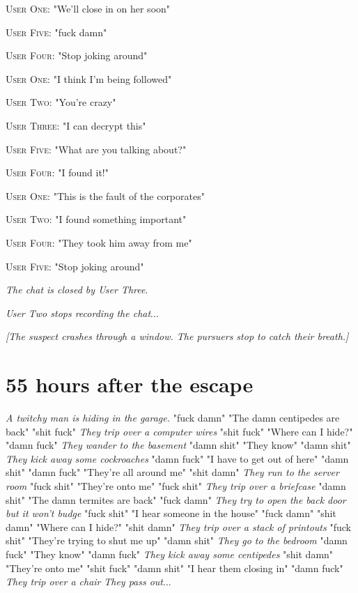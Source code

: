 \documentclass{report}
\begin{document}
\textsc{User One}: "We'll close in on her soon" 

\textsc{User Five}: "fuck damn" 

\textsc{User Four}: "Stop joking around" 

\textsc{User One}: "I think I'm being followed" 

\textsc{User Two}: "You're crazy" 

\textsc{User Three}: "I can decrypt this" 

\textsc{User Five}: "What are you talking about?" 

\textsc{User Four}: "I found it!" 

\textsc{User One}: "This is the fault of the corporates" 

\textsc{User Two}: "I found something important" 

\textsc{User Four}: "They took him away from me" 

\textsc{User Five}: "Stop joking around" 

\textit{The chat is closed by User Three}. 

\textit{User Two stops recording the chat}...

\textit{[The suspect crashes through a window. The pursuers stop to catch their breath.]}


\section*{55 \small{hours after the escape}}

\textit{A twitchy man is hiding in the garage.} "fuck damn" "The damn centipedes are back" "shit fuck" \textit{They trip over a computer wires} "shit fuck" "Where can I hide?" "damn fuck" \textit{They wander to the basement} "damn shit" "They know" "damn shit" \textit{They kick away some cockroaches} "damn fuck" "I have to get out of here" "damn shit" \textit{} "damn fuck" "They're all around me" "shit damn" \textit{They run to the server room} "fuck shit" "They're onto me" "fuck shit" \textit{They trip over a briefcase} "damn shit" "The damn termites are back" "fuck damn" \textit{They try to open the back door but it won't budge} "fuck shit" "I hear someone in the house" "fuck damn" \textit{} "shit damn" "Where can I hide?" "shit damn" \textit{They trip over a stack of printouts} "fuck shit" "They're trying to shut me up" "damn shit" \textit{They go to the bedroom} "damn fuck" "They know" "damn fuck" \textit{They kick away some centipedes} "shit damn" "They're onto me" "shit fuck" \textit{} "damn shit" "I hear them closing in" "damn fuck" \textit{They trip over a chair} \textit{They pass out}...
\end{document}
